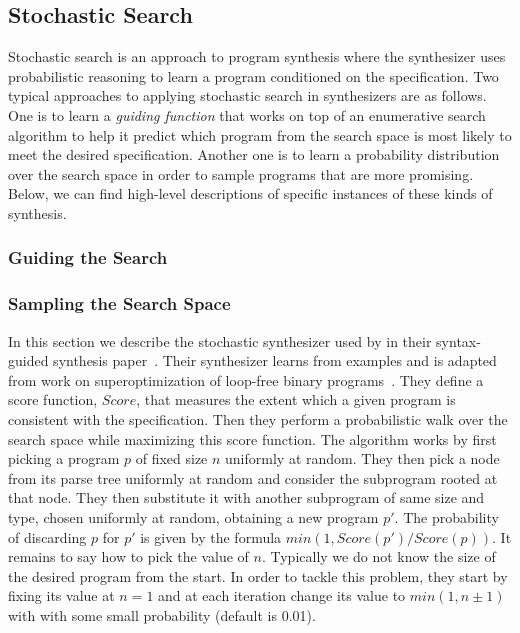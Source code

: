 \subsection{Stochastic Search}
\label{sec:stochastic-search}

Stochastic search is an approach to program synthesis where the synthesizer uses
probabilistic reasoning to learn a program conditioned on the specification. Two
typical approaches to applying stochastic search in synthesizers are as follows.
One is to learn a \textit{guiding function} that works on top of an enumerative
search algorithm to help it predict which program from the search space is most
likely to meet the desired specification. Another one is to learn a probability
distribution over the search space in order to sample programs that are more
promising. Below, we can find high-level descriptions of specific instances of
these kinds of synthesis.

\subsubsection{Guiding the Search}
\label{sec:guiding}

\subsubsection{Sampling the Search Space}
\label{sec:sampling}

In this section we describe the stochastic synthesizer used by
\citeauthor{Alur:sygus:2013} in their syntax-guided synthesis
paper~\cite{Alur:sygus:2013}. Their synthesizer learns from examples and is
adapted from work on superoptimization of loop-free binary
programs~\cite{Schkufza:2013:SS}. They define a score function, $Score$, that
measures the extent which a given program is consistent with the specification.
Then they perform a probabilistic walk over the search space while maximizing
this score function. The algorithm works by first picking a program $p$ of fixed
size $n$ uniformly at random. They then pick a node from its parse tree
uniformly at random and consider the subprogram rooted at that node. They then
substitute it with another subprogram of same size and type, chosen uniformly at
random, obtaining a new program $p'$. The probability of discarding $p$ for $p'$
is given by the formula $min(1, Score(p')/Score(p))$. It remains to say how to
pick the value of $n$. Typically we do not know the size of the desired program
from the start. In order to tackle this problem, they start by fixing its value
at $n = 1$ and at each iteration change its value to $min(1, n\pm{}1)$ with with
some small probability (default is 0.01).
